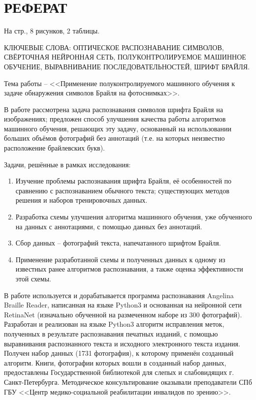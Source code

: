\documentclass{main.tex}[subfiles]
\begin{document}
\thispagestyle{empty}
\section*{РЕФЕРАТ}

На \pageref*{LastPage} стр., 8 рисунков, 2 таблицы.

КЛЮЧЕВЫЕ СЛОВА: ОПТИЧЕСКОЕ РАСПОЗНАВАНИЕ СИМВОЛОВ, СВЁРТОЧНАЯ НЕЙРОННАЯ СЕТЬ, ПОЛУКОНТРОЛИРУЕМОЕ МАШИННОЕ ОБУЧЕНИЕ, ВЫРАВНИВАНИЕ ПОСЛЕДОВАТЕЛЬНОСТЕЙ, ШРИФТ БРАЙЛЯ.

Тема работы -- <<Применение полуконтролируемого машинного обучения к задаче обнаружения символов Брайля на фотоснимках>>.

В работе рассмотрена задача распознавания символов шрифта Брайля на изображениях; предложен способ улучшения качества работы алгоритмов машинного обучения, решающих эту задачу, основанный на использовании больших объёмов фотографий без аннотаций (т.е. на которых неизвестно расположение брайлевских букв).

Задачи, решённые в рамках исследования:
\begin{enumerate}[noitemsep]
    \item Изучение проблемы распознавания шрифта Брайля, её особенностей по сравнению с распознаванием обычного текста; существующих методов решения и наборов тренировочных данных.
    \item Разработка схемы улучшения алгоритма машинного обучения, уже обученного на данных с аннотациями, с помощью данных без аннотаций.
    \item Сбор данных -- фотографий текста, напечатанного шрифтом Брайля.
    \item Применение разработанной схемы и полученных данных к одному из известных ранее алгоритмов распознавания, а также оценка эффективности этой схемы.
\end{enumerate}

В работе используется и дорабатывается программа распознавания Angelina Braille Reader, написанная на языке Python3 и основанная на нейронной сети Retina\-Net (изначально обученной на размеченном наборе из 300 фотографий).
Разработан и реализован на языке Python3 алгоритм исправления меток, полученных в результате распознавания печатных изданий, с помощью выравнивания распознанного текста и исходного электронного текста издания.
Получен набор данных (1731 фотография), к которому применён созданный алгоритм.
Книги, фотографии которых вошли в созданный набор данных, предоставлены Государственной библиотекой для слепых и слабовидящих г. Санкт-Петербурга.
Методическое консультирование оказывали преподаватели СПб ГБУ <<Центр медико-социальной реабилитации инвалидов по зрению>>.
\end{document}
